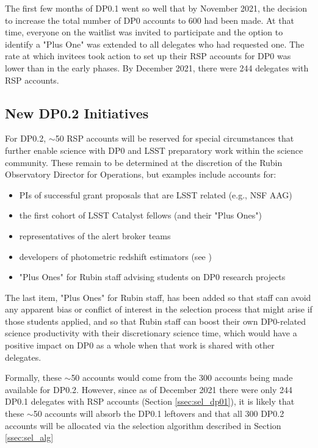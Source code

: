 \documentclass[DM,lsstdraft,authoryear,toc]{lsstdoc}
\begin{document}
The first few months of DP0.1 went so well that by November 2021, the decision to increase the total number of DP0 accounts to 600 had been made.
At that time, everyone on the waitlist was invited to participate and the option to identify a "Plus One" was extended to all delegates who had requested one.
The rate at which invitees took action to set up their RSP accounts for DP0 was lower than in the early phases.
By December 2021, there were 244 delegates with RSP accounts.


\subsection{New DP0.2 Initiatives}\label{ssec:sel_dp02}

For DP0.2, $\sim$50 RSP accounts will be reserved for special circumstances that further enable science with DP0 and LSST preparatory work within the science community.
These remain to be determined at the discretion of the Rubin Observatory Director for Operations, but examples include accounts for:
\begin{itemize}
\item PIs of successful grant proposals that are LSST related (e.g., NSF AAG)
\item the first cohort of LSST Catalyst fellows (and their "Plus Ones")
\item representatives of the alert broker teams
\item developers of photometric redshift estimators (see )
\item "Plus Ones" for Rubin staff advising students on DP0 research projects
\end{itemize}

The last item, "Plus Ones" for Rubin staff, has been added so that staff can avoid any apparent bias or conflict of interest in the selection process that might arise if those students applied, and so that Rubin staff can boost their own DP0-related science productivity with their discretionary science time, which would have a positive impact on DP0 as a whole when that work is shared with other delegates.

Formally, these $\sim$50 accounts would come from the 300 accounts being made available for DP0.2.
However, since as of December 2021 there were only 244 DP0.1 delegates with RSP accounts (Section \ref{ssec:sel_dp01}), it is likely that these $\sim$50 accounts will absorb the DP0.1 leftovers and that all 300 DP0.2 accounts will be allocated via the selection algorithm described in Section \ref{ssec:sel_alg}
\end{document}
